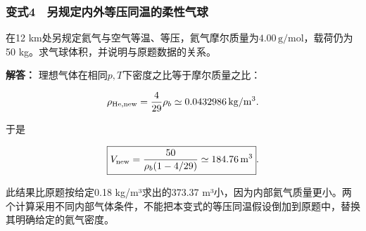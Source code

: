 \documentclass[12pt,a4paper,fontset=fandol]{ctexart}
\begin{document}
\par\noindent\begin{minipage}{\linewidth}
\subsubsection{变式4　另规定内外等压同温的柔性气球}\label{ux53d8ux5f0f4-ux53e6ux89c4ux5b9aux5185ux5916ux7b49ux538bux540cux6e29ux7684ux67d4ux6027ux6c14ux7403}

在12
km处另规定氦气与空气等温、等压，氦气摩尔质量为\(4.00\,\mathrm{g/mol}\)，载荷仍为50
kg。求气球体积，并说明与原题数据的关系。

\textbf{解答：} 理想气体在相同\(p,T\)下密度之比等于摩尔质量之比：

\[
\rho_{\rm He,new}=\frac4{29}\rho_b
\simeq0.0432986\,\mathrm{kg/m^3}.
\]

于是

\[
\boxed{
V_{\rm new}
=\frac{50}{\rho_b(1-4/29)}
\simeq184.76\,\mathrm{m^3}}.
\]

此结果比原题按给定0.18 kg/m³求出的373.37
m³小，因为内部氦气质量更小。两个计算采用不同内部气体条件，不能把本变式的等压同温假设倒加到原题中，替换其明确给定的氦气密度。
\end{minipage}\par
\end{document}
